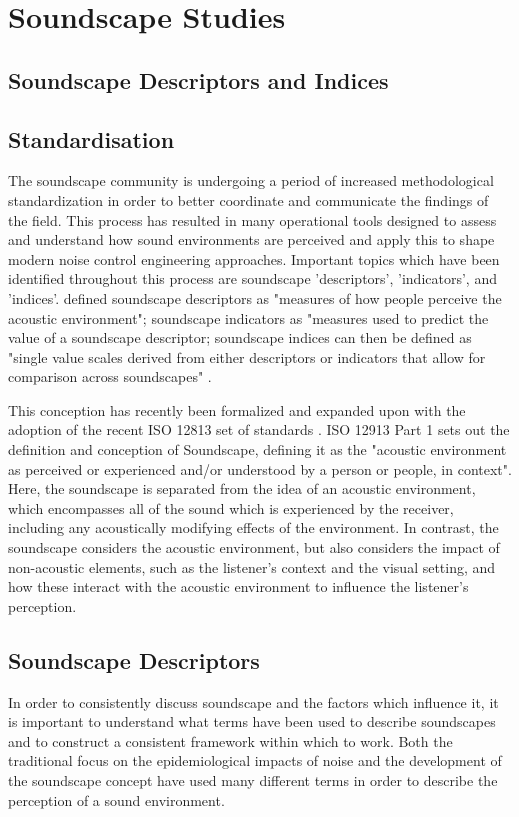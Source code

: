 \section{Soundscape Studies}

\subsection{Soundscape Descriptors and Indices}


\subsection{Standardisation}
The soundscape community is undergoing a period of increased methodological standardization in order to better coordinate and communicate the findings of the field. This process has resulted in many operational tools designed to assess and understand how sound environments are perceived and apply this to shape modern noise control engineering approaches. Important topics which have been identified throughout this process are soundscape 'descriptors', 'indicators', and 'indices'. \citet{Aletta2016Soundscape} defined soundscape descriptors as "measures of how people perceive the acoustic environment"; soundscape indicators as "measures used to predict the value of a soundscape descriptor; soundscape indices can then be defined as "single value scales derived from either descriptors or indicators that allow for comparison across soundscapes" \citep{Kang2019Towards}.

This conception has recently been formalized and expanded upon with the adoption of the recent ISO 12813 set of standards \citep{ISO12913Part1, ISO12913Part2,ISO12913Part3}. ISO 12913 Part 1 sets out the definition and conception of Soundscape, defining it as the "acoustic environment as perceived or experienced and/or understood by a person or people, in context". Here, the soundscape is separated from the idea of an acoustic environment, which encompasses all of the sound which is experienced by the receiver, including any acoustically modifying effects of the environment. In contrast, the soundscape considers the acoustic environment, but also considers the impact of non-acoustic elements, such as the listener's context and the visual setting, and how these interact with the acoustic environment to influence the listener's perception.

\subsection{Soundscape Descriptors}
In order to consistently discuss soundscape and the factors which influence it, it is important to understand what terms have been used to describe soundscapes and to construct a consistent framework within which to work. Both the traditional focus on the epidemiological impacts of noise and the development of the soundscape concept have used many different terms in order to describe the perception of a sound environment.

